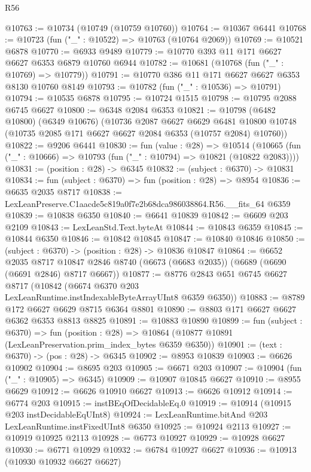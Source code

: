 \begin{lexlean}{R56}
\begin{coremodule}
@10763 := @10734 (@10749 (@10759 @10760))
@10764 := @10367 @6441
@10768 := @10723 (fun ("_" : @10522) => @10763 (@10764 @2069))
@10769 := @10521 @6878
@10770 := @6933 @9489
@10779 := @10770 @393 @11 @171 @6627 @6627 @6353 @6879 @10760 @6944
@10782 := @10681 (@10768 (fun ("_" : @10769) => @10779))
@10791 := @10770 @386 @11 @171 @6627 @6627 @6353 @8130 @10760 @8149
@10793 := @10782 (fun ("_" : @10536) => @10791)
@10794 := @10535 @6878
@10795 := @10724 @1515
@10798 := @10795 @2088 @6745 @6627
@10800 := @6348 @2084 @6353
@10821 := @10798
    (@6482 @10800)
    (@6349 @10676)
    (@10736
      @2087
      @6627
      @6629
      @6481
      @10800
      @10748
      (@10735 @2085 @171 @6627 @6627 @2084 @6353 (@10757 @2084) @10760))
@10822 := @9206 @6441
@10830 := fun (value : @28) =>
  @10514 (@10665 (fun ("_" : @10666) => @10793 (fun ("_" : @10794) => @10821 (@10822 @2083))))
@10831 := (position : @28) -> @6345
@10832 := (subject : @6370) -> @10831
@10834 := fun (subject : @6370) => fun (position : @28) => @8954
@10836 := @6635 @2035 @8717
@10838 := LexLeanPreserve.C1aacde5c819a0f7e2b68dca986038864.R56.__fits_64 @6359
@10839 := @10838 @6350
@10840 := @6641 @10839
@10842 := @6609 @203 @2109
@10843 := LexLeanStd.Text.byteAt
@10844 := @10843 @6359
@10845 := @10844 @6350
@10846 := @10842 @10845
@10847 := @10840 @10846
@10850 := (subject : @6370) -> (position : @28) -> @10836 @10847
@10864 := @6652
    @2035
    @8717
    @10847
    @2846
    @8740
    (@6673 (@6683 @2035))
    (@6689 (@6690 (@6691 @2846) @8717 @6667))
@10877 := @8776
    @2843
    @651
    @6745
    @6627
    @8717
    (@10842 (@6674 @6370 @203 LexLeanRuntime.instIndexableByteArrayUInt8 @6359 @6350))
@10883 := @8789 @172 @6627 @6629 @8715 @6364 @8801
@10890 := @8803 @171 @6627 @6627 @6362 @6353 @8813 @8825
@10891 := @10883 @10890
@10899 := fun (subject : @6370) =>
  fun (position : @28) => @10864 (@10877 @10891 (LexLeanPreservation.prim_index_bytes @6359 @6350))
@10901 := (text : @6370) -> (pos : @28) -> @6345
@10902 := @8953 @10839
@10903 := @6626 @10902
@10904 := @8695 @203
@10905 := @6671 @203
@10907 := @10904 (fun ("_" : @10905) => @6345)
@10909 := @10907 @10845 @6627
@10910 := @8955 @6629
@10912 := @6626 @10910 @6627
@10913 := @6626 @10912
@10914 := @6774 @203
@10915 := instBEqOfDecidableEq.{0}
@10919 := @10914 (@10915 @203 instDecidableEqUInt8)
@10924 := LexLeanRuntime.bitAnd @203 LexLeanRuntime.instFixedUInt8 @6350
@10925 := @10924 @2113
@10927 := @10919 @10925 @2113
@10928 := @6773 @10927
@10929 := @10928 @6627
@10930 := @6771 @10929
@10932 := @6784 @10927 @6627
@10936 := @10913 (@10930 @10932 @6627 @6627)

\end{coremodule}
\end{lexlean}
